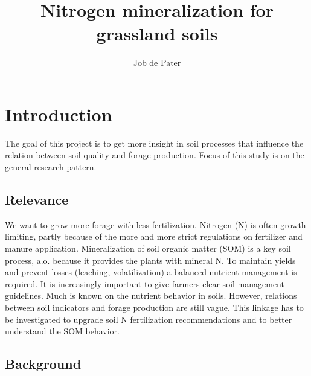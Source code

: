 \documentclass[10pt,twoside,dutch,english]{report}
\author{Job de Pater}
\title{Nitrogen mineralization for grassland soils } %
\begin{document}
\setcounter{tocdepth}{1}
\linespread{1.0}
\tableofcontents
\linespread{1.3}
\thispagestyle{empty}
\pagebreak
{}



\chapter{Introduction}
The goal of this project is to get more insight in soil processes that influence the relation between soil quality and forage production. Focus of this study is on the general research pattern. 

	\section{Relevance}
	We want to grow more forage with less fertilization. Nitrogen (N) is often growth limiting, partly because of the more and more strict regulations on fertilizer and manure application. Mineralization of soil organic matter (SOM) is a key soil process, a.o. because it provides the plants with mineral N. To maintain yields and prevent losses (leaching, volatilization) a balanced nutrient management is required. It is increasingly important to give farmers clear soil management guidelines. Much is known on the nutrient behavior in soils. However, relations between soil indicators and forage production are still vague.  This linkage has to be investigated to upgrade soil N fertilization recommendations and to better understand the SOM behavior. 
	
		\section{Background} %
	
			
\end{document}
